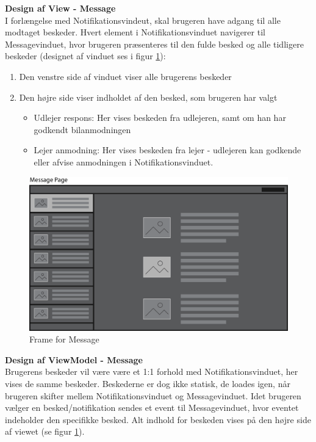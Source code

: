 \documentclass[Rapport/Rapport_main.tex]{subfiles}
\begin{document}
\textbf{Design af View - Message}\\
I forlængelse med Notifikationsvindeut, skal brugeren have adgang til alle modtaget beskeder. Hvert element i Notifikationsvinduet navigerer til Messagevinduet, hvor brugeren præsenteres til den fulde besked og alle tidligere beskeder (designet af vinduet ses i figur \ref{fig:wire_message}): 
\begin{enumerate}
    \item Den venstre side af vinduet viser alle brugerens beskeder 
    \item Den højre side viser indholdet af den besked, som brugeren har valgt
    \begin{itemize}
        \item Udlejer respons: Her vises beskeden fra udlejeren, samt om han har godkendt bilanmodningen
        \item Lejer anmodning: Her vises beskeden fra lejer - udlejeren kan godkende eller afvise anmodningen i Notifikationsvinduet. 
    \end{itemize}
\end{enumerate}
\begin{figure}[H]
    \centering
    \includegraphics[width=\textwidth]{SoftwareDesign/MVVMDesigns/Graphics/MessageView.png}
    \caption{Frame for Message}
    \label{fig:wire_message}
\end{figure}

\textbf{Design af ViewModel - Message}\\
Brugerens beskeder vil være være et 1:1 forhold med Notifikationsvinduet, her vises de samme beskeder. Beskederne er dog ikke statisk, de loades igen, når brugeren skifter mellem Notifikationsvinduet og Messagevinduet. Idet brugeren vælger en besked/notifikation sendes et event til Messagevinduet, hvor eventet indeholder den specifikke besked. Alt indhold for beskeden vises på den højre side af viewet (se figur \ref{fig:wire_message}). 
\end{document}

